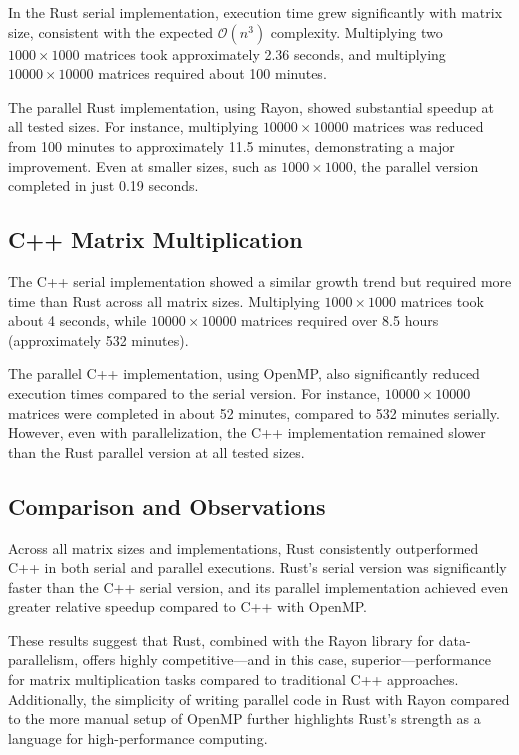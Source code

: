 \documentclass[12pt]{article}
\begin{document}
In the Rust serial implementation, execution time grew significantly with matrix size, consistent with the expected \( \mathcal{O}(n^3) \) complexity.
Multiplying two \(1000 \times 1000\) matrices took approximately 2.36 seconds, and multiplying \(10000 \times 10000\) matrices required about 100 minutes.

The parallel Rust implementation, using Rayon, showed substantial speedup at all tested sizes. For instance, multiplying \(10000 \times 10000\) matrices
was reduced from 100 minutes to approximately 11.5 minutes, demonstrating a major improvement. Even at smaller sizes, such as \(1000 \times 1000\), the
parallel version completed in just 0.19 seconds.

\subsection*{C++ Matrix Multiplication}

The C++ serial implementation showed a similar growth trend but required more time than Rust across all matrix sizes. Multiplying \(1000 \times 1000\) matrices
took about 4 seconds, while \(10000 \times 10000\) matrices required over 8.5 hours (approximately 532 minutes).

The parallel C++ implementation, using OpenMP, also significantly reduced execution times compared to the serial version. For instance, \(10000 \times 10000\)
matrices were completed in about 52 minutes, compared to 532 minutes serially. However, even with parallelization, the C++ implementation remained slower
than the Rust parallel version at all tested sizes.

\subsection*{Comparison and Observations}

Across all matrix sizes and implementations, Rust consistently outperformed C++ in both serial and parallel executions. Rust's serial version was significantly
faster than the C++ serial version, and its parallel implementation achieved even greater relative speedup compared to C++ with OpenMP.

These results suggest that Rust, combined with the Rayon library for data-parallelism, offers highly competitive—and in this case, superior—performance for
matrix multiplication tasks compared to traditional C++ approaches. Additionally, the simplicity of writing parallel code in Rust with Rayon compared to the
more manual setup of OpenMP further highlights Rust's strength as a language for high-performance computing.
\end{document}
